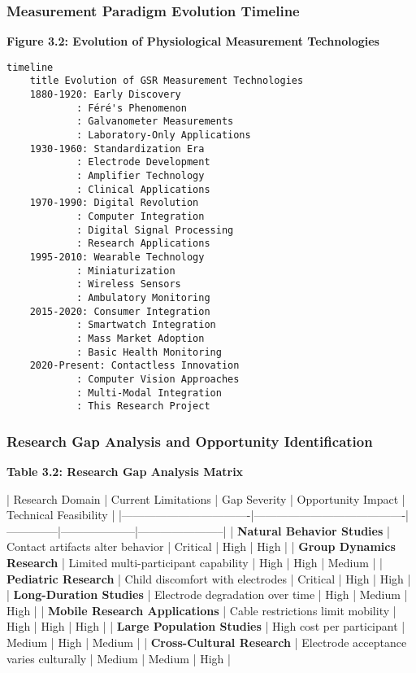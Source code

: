 \documentclass[12pt,a4paper]{report}
\begin{document}
\subsubsection{Measurement Paradigm Evolution Timeline}

\textbf{Figure 3.2: Evolution of Physiological Measurement Technologies}

\begin{verbatim}
timeline
    title Evolution of GSR Measurement Technologies
    1880-1920: Early Discovery
            : Féré's Phenomenon
            : Galvanometer Measurements
            : Laboratory-Only Applications
    1930-1960: Standardization Era
            : Electrode Development
            : Amplifier Technology
            : Clinical Applications
    1970-1990: Digital Revolution
            : Computer Integration
            : Digital Signal Processing
            : Research Applications
    1995-2010: Wearable Technology
            : Miniaturization
            : Wireless Sensors
            : Ambulatory Monitoring
    2015-2020: Consumer Integration
            : Smartwatch Integration
            : Mass Market Adoption
            : Basic Health Monitoring
    2020-Present: Contactless Innovation
            : Computer Vision Approaches
            : Multi-Modal Integration
            : This Research Project
\end{verbatim}

\subsubsection{Research Gap Analysis and Opportunity Identification}

\textbf{Table 3.2: Research Gap Analysis Matrix}

| Research Domain                  | Current Limitations                    | Gap Severity | Opportunity Impact | Technical Feasibility |
|----------------------------------|----------------------------------------|--------------|--------------------|-----------------------|
| \textbf{Natural Behavior Studies}     | Contact artifacts alter behavior       | Critical     | High               | High                  |
| \textbf{Group Dynamics Research}      | Limited multi-participant capability   | High         | High               | Medium                |
| \textbf{Pediatric Research}           | Child discomfort with electrodes       | Critical     | High               | High                  |
| \textbf{Long-Duration Studies}        | Electrode degradation over time        | High         | Medium             | High                  |
| \textbf{Mobile Research Applications} | Cable restrictions limit mobility      | High         | High               | High                  |
| \textbf{Large Population Studies}     | High cost per participant              | Medium       | High               | Medium                |
| \textbf{Cross-Cultural Research}      | Electrode acceptance varies culturally | Medium       | Medium             | High                  |
\end{document}
